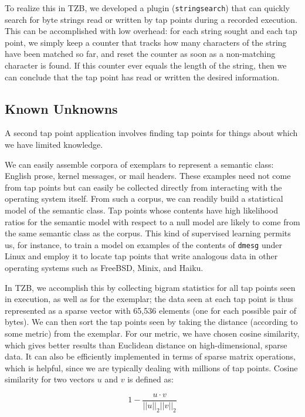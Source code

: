 To realize this in TZB, we developed a plugin (\texttt{stringsearch})
that can quickly search for byte strings read or written by tap points
during a recorded execution. This can be accomplished with low overhead:
for each string sought and each tap point, we simply keep a counter that
tracks how many characters of the string have been matched so far, and
reset the counter as soon as a non-matching character is found. If this
counter ever equals the length of the string, then we can conclude that
the tap point has read or written the desired information.

\subsection{Known Unknowns}
\label{sec:technical:subsec:knownunk}

A second tap point application involves finding tap points for things
about which we have limited knowledge.

We can easily assemble corpora of exemplars to represent a semantic
class: English prose, kernel messages, or mail headers. These examples
need not come from tap points but can easily be collected directly from
interacting with the operating system itself. From such a corpus, we can
readily build a statistical model of the semantic class. Tap points
whose contents have high likelihood ratios for the semantic model with
respect to a null model are likely to come from the same semantic class
as the corpus. This kind of supervised learning permits us, for
instance, to train a model on examples of the contents of \texttt{dmesg}
under Linux and employ it to locate tap points that write analogous data
in other operating systems such as FreeBSD, Minix, and Haiku.

In TZB, we accomplish this by collecting bigram statistics for all tap
points seen in execution, as well as for the exemplar; the data seen at
each tap point is thus represented as a sparse vector with 65,536
elements (one for each possible pair of bytes). We can then sort the tap
points seen by taking the distance (according to some metric) from the
exemplar. For our metric, we have chosen cosine similarity, which gives
better results than Euclidean distance on high-dimensional, sparse data.
It can also be efficiently implemented in terms of sparse matrix
operations, which is helpful, since we are typically dealing with
millions of tap points. Cosine similarity for two vectors $u$ and $v$ is
defined as:

\[
1 - \frac{u \cdot v}{||u||_2 ||v||_2}
\]


